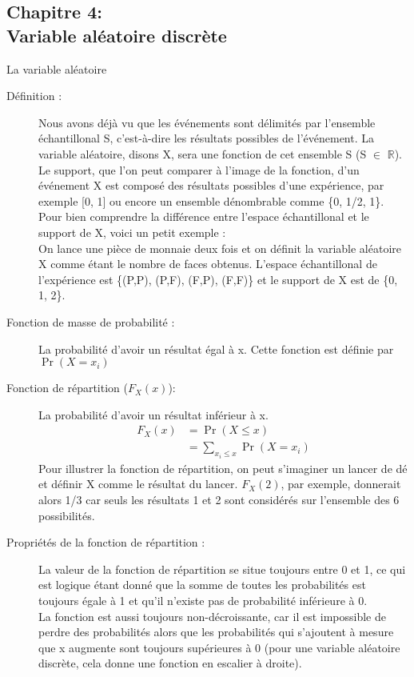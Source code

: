 \documentclass[10pt, french]{article}
\begin{document}
\begin{multicols*}{2}
\section{Chapitre 4:\\ Variable aléatoire discrète}
\begin{probch4}{La variable aléatoire}
  \begin{description}
    \item[Définition :] Nous avons déjà vu que les événements sont délimités par l'ensemble échantillonal S, c'est-à-dire les résultats possibles de l'événement. La variable aléatoire, disons X, sera une fonction de cet ensemble S (S $\in$ $\mathbb{R}$).\\
    Le support, que l'on peut comparer à l'image de la fonction, d'un événement X est composé des résultats possibles d'une expérience, par exemple [0, 1] ou encore un ensemble dénombrable comme \{0, 1/2, 1\}.\\
    Pour bien comprendre la différence entre l'espace échantillonal et le support de X, voici un petit exemple : \\
    On lance une pièce de monnaie deux fois et on définit la variable aléatoire X comme étant le nombre de faces obtenus. L'espace échantillonal de l'expérience est \{(P,P), (P,F), (F,P), (F,F)\} et le support de X est de \{0, 1, 2\}.
	\item [Fonction de masse de probabilité :] La probabilité d'avoir un résultat égal à x. Cette fonction est définie par $\Pr(X = x_i)$ 
	\item[Fonction de répartition ($F_{X} (x)$):] La probabilité d'avoir un résultat inférieur à x.
    \begin{align*}
    F_{X} (x) &= \Pr(X \le x) \\
    &= \sum_{x_{i} \le x}^{} \Pr(X = x_{i})
    \end{align*}
    Pour illustrer la fonction de répartition, on peut s'imaginer un lancer de dé et définir X comme le résultat du lancer. $F_{X} (2)$, par exemple, donnerait alors 1/3 car seuls les résultats 1 et 2 sont considérés sur l'ensemble des 6 possibilités. 
    \item[Propriétés de la fonction de répartition :] La valeur de la fonction de répartition se situe toujours entre 0 et 1, ce qui est logique étant donné que la somme de toutes les probabilités est toujours égale à 1 et qu'il n'existe pas de probabilité inférieure à 0. \\
    La fonction est aussi toujours non-décroissante, car il est impossible de perdre des probabilités alors que les probabilités qui s'ajoutent à mesure que x augmente sont toujours supérieures à 0 (pour une variable aléatoire discrète, cela donne une fonction en escalier à droite).\\

\end{description}
\end{probch4}
\end{multicols*}
\end{document}
